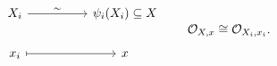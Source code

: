 \[\begin{tikzcd}[column sep=huge]
X_i \arrow[r,"\sim"] & \psi_i(X_i)\subseteq X\\
x_i \arrow[r,mapsto] & x
\end{tikzcd}\qquad \OO_{X,x}\cong\OO_{X_i,x_i}.\]
